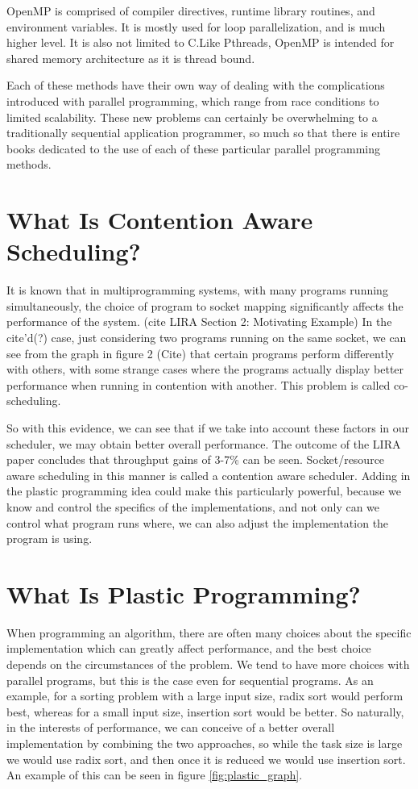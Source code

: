 OpenMP is comprised of compiler directives, runtime library routines, and environment variables. It is mostly used for loop parallelization, and is much higher level. It is also not limited to C.Like Pthreads, OpenMP is intended for shared memory architecture as it is thread bound.

Each of these methods have their own way of dealing with the complications introduced with parallel programming, which range from race conditions to limited scalability. These new problems can certainly be overwhelming to a traditionally sequential application programmer, so much so that there is entire books dedicated to the use of each of these particular parallel programming methods. 



\section{What Is Contention Aware Scheduling?}

It is known that in multiprogramming systems, with many programs running simultaneously, the choice of program to socket mapping significantly affects the performance of the system. (cite LIRA Section 2: Motivating Example) In the cite'd(?) case, just considering two programs running on the same socket, we can see from the graph in figure 2 (Cite) that certain programs perform differently with others, with some strange cases where the programs actually display better performance when running in contention with another. This problem is called co-scheduling.

So with this evidence, we can see that if we take into account these factors in our scheduler, we may obtain better overall performance. The outcome of the LIRA paper concludes that throughput gains of 3-7\% can be seen. Socket/resource aware scheduling in this manner is called a contention aware scheduler. Adding in the plastic programming idea could make this particularly powerful, because we know and control the specifics of the implementations, and not only can we control what program runs where, we can also adjust the implementation the program is using.



\section{What Is Plastic Programming?}

When programming an algorithm, there are often many choices about the specific implementation which can greatly affect performance, and the best choice depends on the circumstances of the problem. We tend to have more choices with parallel programs, but this is the case even for sequential programs. As an example, for a sorting problem with a large input size, radix sort would perform best, whereas for a small input size, insertion sort would be better. So naturally, in the interests of performance, we can conceive of a better overall implementation by combining the two approaches, so while the task size is large we would use radix sort, and then once it is reduced we would use insertion sort. An example of this can be seen in figure \ref{fig:plastic_graph}. 

